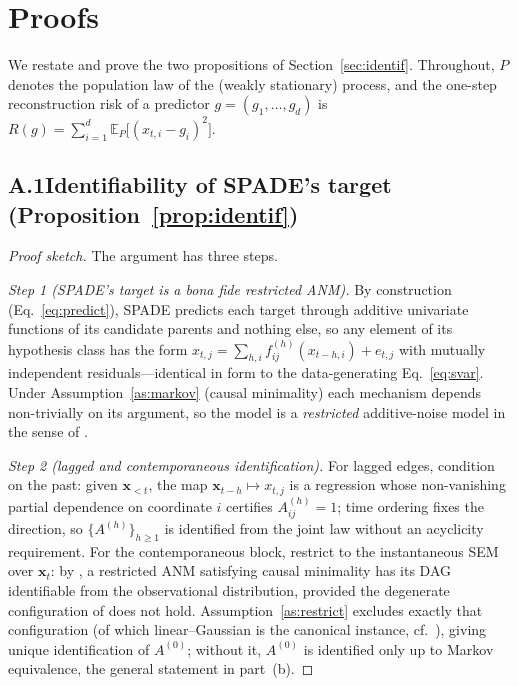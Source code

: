 \section{Proofs}
\label{app:proofs}

We restate and prove the two propositions of Section~\ref{sec:identif}. Throughout,
$P$ denotes the population law of the (weakly stationary) process, and the
one-step reconstruction risk of a predictor $g=(g_1,\dots,g_d)$ is
$R(g)=\sum_{i=1}^{d}\mathbb{E}_P\big[(x_{t,i}-g_i)^2\big]$.

\subsection*{A.1\quad Identifiability of SPADE's target (Proposition~\ref{prop:identif})}

\begin{proof}[Proof sketch]
The argument has three steps.

\emph{Step 1 (SPADE's target is a bona fide restricted ANM).} By construction
(Eq.~\ref{eq:predict}), SPADE predicts each target through additive univariate
functions of its candidate parents and nothing else, so any element of its
hypothesis class has the form $x_{t,j}=\sum_{h,i} f^{(h)}_{ij}(x_{t-h,i})+e_{t,j}$
with mutually independent residuals---identical in form to the data-generating
Eq.~\eqref{eq:svar}. Under Assumption~\ref{as:markov} (causal minimality) each
mechanism depends non-trivially on its argument, so the model is a
\emph{restricted} additive-noise model in the sense of
\citet[\S 4]{peters2014causal}.

\emph{Step 2 (lagged and contemporaneous identification).}
For lagged edges, condition on the past: given
$\mathbf{x}_{<t}$, the map $\mathbf{x}_{t-h}\mapsto x_{t,j}$ is a regression whose
non-vanishing partial dependence on coordinate $i$ certifies
$A^{(h)}_{ij}=1$; time ordering fixes the direction, so
$\{A^{(h)}\}_{h\ge 1}$ is identified from the joint law without an acyclicity
requirement. For the contemporaneous block, restrict to the instantaneous SEM
over $\mathbf{x}_t$: by \citet[Thm.~31]{peters2014causal}, a restricted ANM
satisfying causal minimality has its DAG identifiable from the observational
distribution, provided the degenerate configuration of
\citet[Cond.~18]{peters2014causal} does not hold. Assumption~\ref{as:restrict}
excludes exactly that configuration (of which linear--Gaussian is the canonical
instance, cf.\ \citealt{hoyer2008nonlinear}), giving unique identification of
$A^{(0)}$; without it, $A^{(0)}$ is identified only up to Markov equivalence, the
general statement in part~(b).


\end{proof}
